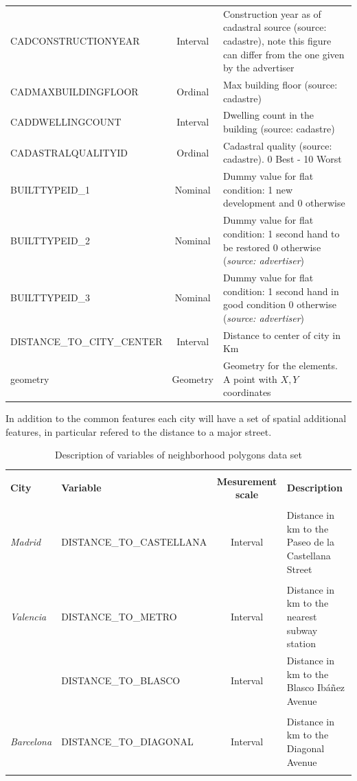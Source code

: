 \documentclass[times,final]{elsarticle}
\begin{document}
\begin{footnotesize}
\begin{longtable}{p{40mm} c p{63mm}}
CADCONSTRUCTIONYEAR & Interval & Construction year as of cadastral source (source: cadastre), note this figure can differ from the one given by the advertiser\\
CADMAXBUILDINGFLOOR & Ordinal & Max building floor (source: cadastre)\\
CADDWELLINGCOUNT & Interval & Dwelling count in the building (source: cadastre)\\
CADASTRALQUALITYID & Ordinal & Cadastral quality (source: cadastre). 0 Best - 10 Worst\\
BUILTTYPEID\_1 & Nominal & Dummy value for flat condition: 1 new development and 0 otherwise\\
BUILTTYPEID\_2 & Nominal & Dummy value for flat condition: 1 second hand to be restored 0 otherwise (\emph{source: advertiser})\\
BUILTTYPEID\_3 & Nominal & Dummy value for flat condition: 1 second hand in good condition 0 otherwise (\emph{source: advertiser})\\
DISTANCE\_TO\_CITY\_CENTER & Interval & Distance to center of city in Km\\
geometry & Geometry & Geometry for the elements. A point with $X,Y$ coordinates\\
\hline
\hline
\end{longtable}
\end{footnotesize}

In addition to the common features each city will have a set of spatial additional features, in particular refered to the distance to a major street.

\begin{footnotesize}
\begin{longtable}{l p{40mm} c p{63mm}}
\caption{Description of variables of neighborhood polygons data set} \\
\hline
\hline
& & &\\
\textbf{City} & \textbf{Variable} & \textbf{Mesurement scale} & \textbf{Description}\\
\hline
& & &\\
\emph{Madrid} & DISTANCE\_TO\_CASTELLANA & Interval & Distance in km to the Paseo de la Castellana Street \\
& & &\\
\emph{Valencia} & DISTANCE\_TO\_METRO & Interval & Distance in km to the nearest subway station \\
 & DISTANCE\_TO\_BLASCO & Interval & Distance in km to the Blasco Ibáñez Avenue \\
& & &\\
\emph{Barcelona} & DISTANCE\_TO\_DIAGONAL & Interval & Distance in km to the Diagonal Avenue \\
& & &\\
\hline
\hline
\hline
\end{longtable}
\end{footnotesize}
\end{document}
